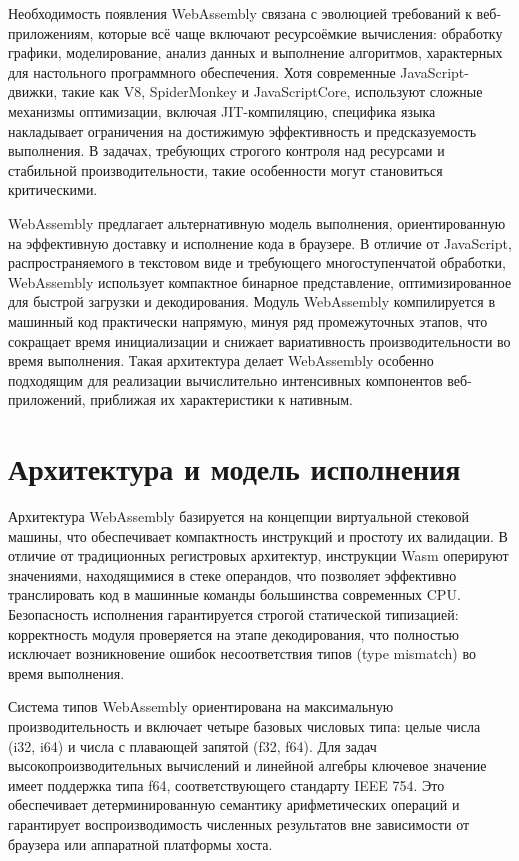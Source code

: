 \documentclass[12pt, oneside]{book}
\begin{document}
    \quad Необходимость появления WebAssembly связана с эволюцией требований к веб-приложениям, которые всё чаще включают ресурсоёмкие вычисления: обработку графики, моделирование, анализ данных и выполнение алгоритмов, характерных для настольного программного обеспечения. Хотя современные JavaScript-движки, такие как V8, SpiderMonkey и JavaScriptCore, используют сложные механизмы оптимизации, включая JIT-компиляцию, специфика языка накладывает ограничения на достижимую эффективность и предсказуемость выполнения. В задачах, требующих строгого контроля над ресурсами и стабильной производительности, такие особенности могут становиться критическими.

    \quad WebAssembly предлагает альтернативную модель выполнения, ориентированную на эффективную доставку и исполнение кода в браузере. В отличие от JavaScript, распространяемого в текстовом виде и требующего многоступенчатой обработки, WebAssembly использует компактное бинарное представление, оптимизированное для быстрой загрузки и декодирования. Модуль WebAssembly компилируется в машинный код практически напрямую, минуя ряд промежуточных этапов, что сокращает время инициализации и снижает вариативность производительности во время выполнения. Такая архитектура делает WebAssembly особенно подходящим для реализации вычислительно интенсивных компонентов веб-приложений, приближая их характеристики к нативным.

\section{Архитектура и модель исполнения}

    \quad Архитектура WebAssembly базируется на концепции виртуальной стековой машины, что обеспечивает компактность инструкций и простоту их валидации. В отличие от традиционных регистровых архитектур, инструкции Wasm оперируют значениями, находящимися в стеке операндов, что позволяет эффективно транслировать код в машинные команды большинства современных CPU. Безопасность исполнения гарантируется строгой статической типизацией: корректность модуля проверяется на этапе декодирования, что полностью исключает возникновение ошибок несоответствия типов (type mismatch) во время выполнения.
    
    \quad Система типов WebAssembly ориентирована на максимальную производительность и включает четыре базовых числовых типа: целые числа (i32, i64) и числа с плавающей запятой (f32, f64). Для задач высокопроизводительных вычислений и линейной алгебры ключевое значение имеет поддержка типа f64, соответствующего стандарту IEEE 754. Это обеспечивает детерминированную семантику арифметических операций и гарантирует воспроизводимость численных результатов вне зависимости от браузера или аппаратной платформы хоста.
    
\end{document}
